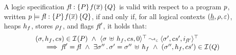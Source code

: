 \begin{definition}
A \jsil logic specification ${\mathit{fl}} : \{ P \} \, \mathit{f}(\overline{x}) \, \{ Q \}$ is valid with respect to a program 
$p$, written $p \models {\ensuremath{\mathit{fl}}} : \{ P \} \, \mathit{f}(\overline{x}) \, \{ Q \}$, if and only if, for all logical 
contexts $(\underline{h}, \rho, \varepsilon)$, heaps $h_f$, stores $\rho_f$, and flags $\mathit{fl}'$, it holds that: 
$$
\begin{array}{l}
   (\jstate, \heap_f, \cs) \in \interpret{}{}(P) 
   \ \wedge \ 
    \abssemrule{\jstate \dunion \heap_f, \cs, 0}{\jstate', \cs', i_{\flag'}}{\top}{\top}{\concrete} \\ \quad \
   \implies
      \flag' = \flag \ \wedge \ \exists \jstate'' \, . \, \jstate' = \jstate'' \dunion \heap_f
          \ \wedge \   (\jstate'', \heap_f, \cs') \in \interpret{}{}(Q) 
\end{array}
$$
\end{definition}


